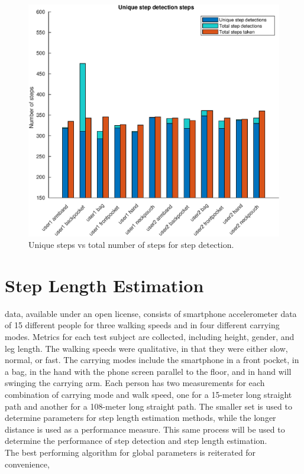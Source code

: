 \begin{figure}[H]
	\centering
	\includegraphics[width=0.7\linewidth]{images/20201127_1626_Unique_step_detection_steps}
	\setlength{\belowcaptionskip}{-20pt}
\caption[False positives and true positives step detection comparison]{Unique steps vs total number of steps for step detection. }
\label{fig:sd_tp_fp_comparison}
\end{figure}

\section{Step Length Estimation}

\citet{Vezocnik2019} data, available under an open license, consists of smartphone accelerometer data of 15 different people for three walking speeds and in four different carrying modes. Metrics for each test subject are collected, including height, gender, and leg length. The walking speeds were qualitative, in that they were either slow, normal, or fast. The carrying modes include the smartphone in a front pocket, in a bag, in the hand with the phone screen parallel to the floor, and in hand will swinging the carrying arm. Each person has two measurements for each combination of carrying mode and walk speed, one for a 15-meter long straight path and another for a 108-meter long straight path. The smaller set is used to determine parameters for step length estimation methods, while the longer distance is used as a performance measure. This same process will be used to determine the performance of step detection and step length estimation.\\
The best performing algorithm for global parameters is reiterated for convenience,

